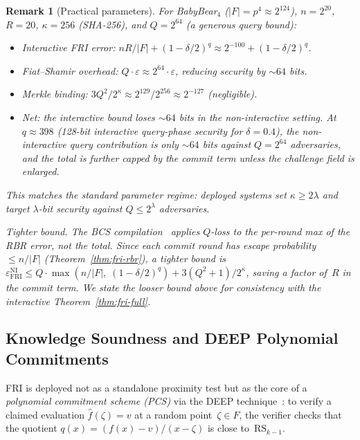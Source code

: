\documentclass[11pt]{article}
\newtheorem{remark}[theorem]{Remark}
\newcommand{\RS}{\mathrm{RS}}
\begin{document}
\begin{remark}[Practical parameters]
\label{rem:fs-parameters}
For BabyBear$_4$ ($|F| = p^4 \approx 2^{124}$), $n = 2^{20}$, $R = 20$, $\kappa = 256$ (SHA-256), and $Q = 2^{64}$ (a generous query bound):
\begin{itemize}[nosep]
\item Interactive FRI error: $nR/|F| + (1{-}\delta/2)^q \approx 2^{-100} + (1{-}\delta/2)^q$.
\item Fiat--Shamir overhead: $Q \cdot \varepsilon \approx 2^{64} \cdot \varepsilon$, reducing security by ${\sim}64$ bits.
\item Merkle binding: $3Q^2/2^\kappa \approx 2^{129}/2^{256} \approx 2^{-127}$ (negligible).
\item Net: the interactive bound loses ${\sim}64$ bits in the non-interactive setting. At $q \approx 398$ (128-bit interactive query-phase security for $\delta=0.4$), the non-interactive query contribution is only ${\sim}64$ bits against $Q = 2^{64}$ adversaries, and the total is further capped by the commit term unless the challenge field is enlarged.
\end{itemize}
This matches the standard parameter regime: deployed systems set $\kappa \geq 2\lambda$ and target $\lambda$-bit security against $Q \leq 2^\lambda$ adversaries.

\emph{Tighter bound.} The BCS compilation~\cite{BGKTTW} applies $Q$-loss to the \emph{per-round max} of the RBR error, not the total.  Since each commit round has escape probability~$\leq n/|F|$ (Theorem~\ref{thm:fri-rbr}), a tighter bound is $\varepsilon_{\mathrm{FRI}}^{\mathrm{NI}} \leq Q \cdot \max(n/|F|,\; (1{-}\delta/2)^q) + 3(Q^2{+}1)/2^\kappa$, saving a factor of~$R$ in the commit term. We state the looser bound above for consistency with the interactive Theorem~\ref{thm:fri-full}.
\end{remark}

\subsection{Knowledge Soundness and DEEP Polynomial Commitments}
\label{subsec:deep}

FRI is deployed not as a standalone proximity test but as the core of a \emph{polynomial commitment scheme (PCS)} via the DEEP technique~\cite{DEEP}: to verify a claimed evaluation $\hat{f}(\zeta) = v$ at a random point~$\zeta \in F$, the verifier checks that the quotient $q(x) = (f(x) - v)/(x - \zeta)$ is close to~$\RS_{k-1}$.
\end{document}
